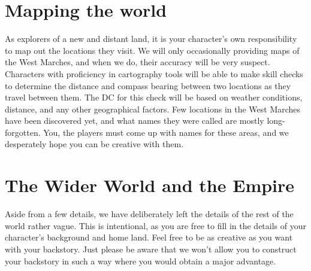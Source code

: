 \section{Mapping the world}
As explorers of a new and distant land, it is your character’s own responsibility to map out the locations they visit. We will only occasionally providing maps of the West Marches, and when we do, their accuracy will be very suspect.\newline
Characters with proficiency in cartography tools will be able to make skill checks to determine the distance and compass bearing between two locations as they travel between them. The DC for this check will be based on weather conditions, distance, and any other geographical factors.\newline
Few locations in the West Marches have been discovered yet, and what names they were called are mostly long-forgotten. You, the players must come up with names for these areas, and we desperately hope you can be creative with them. 
\section{The Wider World and the Empire}
Aside from a few details, we have deliberately left the details of the rest of the world rather vague. This is intentional, as you are free to fill in the details of your character’s background and home land. Feel free to be as creative as you want with your backstory. Just please be aware that we won’t allow you to construct your backstory in such a way where you would obtain a major advantage.